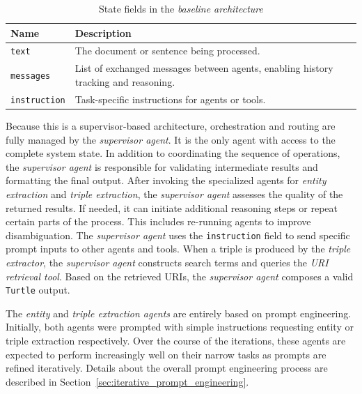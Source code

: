\documentclass[a4paper,oneside,bibliography=totoc]{scrbook}
\begin{document}
\begin{table}[h]
  \centering
  \caption{State fields in the \textit{baseline architecture}}
  \label{tab:baseline_state}
  \begin{tabular}{p{3cm}p{10cm}}
    \toprule
    \textbf{Name}        & \textbf{Description}                                                                \\
    \midrule
    \texttt{text}        & The document or sentence being processed.                                           \\
    \texttt{messages}    & List of exchanged messages between agents, enabling history tracking and reasoning. \\
    \texttt{instruction} & Task-specific instructions for agents or tools.                                     \\
    \bottomrule
  \end{tabular}
\end{table}

Because this is a supervisor-based architecture, orchestration and routing are fully managed by the \textit{supervisor agent}. It is the only agent with access to the complete system state. In addition to coordinating the sequence of operations, the \textit{supervisor agent} is responsible for validating intermediate results and formatting the final output. After invoking the specialized agents for \textit{entity extraction} and \textit{triple extraction}, the \textit{supervisor agent} assesses the quality of the returned results. If needed, it can initiate additional reasoning steps or repeat certain parts of the process. This includes re-running agents to improve disambiguation. The \textit{supervisor agent} uses the \texttt{instruction} field to send specific prompt inputs to other agents and tools. When a triple is produced by the \textit{triple extractor}, the \textit{supervisor agent} constructs search terms and queries the \textit{\ac{URI} retrieval tool}. Based on the retrieved \acp{URI}, the \textit{supervisor agent} composes a valid \texttt{Turtle} output.

The \textit{entity} and \textit{triple extraction agents} are entirely based on prompt engineering. Initially, both agents were prompted with simple instructions requesting entity or triple extraction respectively. Over the course of the iterations, these agents are expected to perform increasingly well on their narrow tasks as prompts are refined iteratively. Details about the overall prompt engineering process are described in Section~\ref{sec:iterative_prompt_engineering}.
\end{document}
